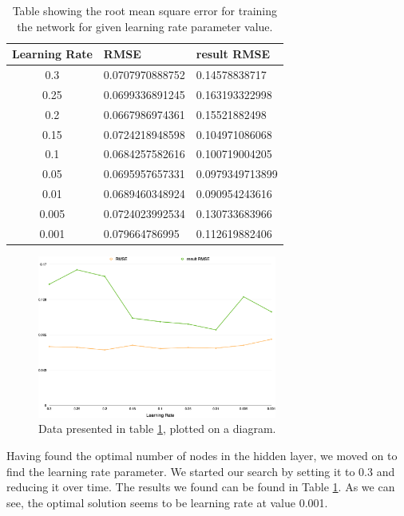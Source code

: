 \begin{table}
\begin{center}
\begin{tabular} {| c | l | l |} \hline
 Learning Rate & RMSE & result RMSE \\  \hline \hline
 0.3 & 0.0707970888752 & 0.14578838717 \\ \hline
 0.25 & 0.0699336891245 & 0.163193322998 \\ \hline
 0.2 &  0.0667986974361 & 0.15521882498 \\ \hline
 0.15 & 0.0724218948598 & 0.104971086068 \\ \hline
 0.1 & 0.0684257582616 & 0.100719004205 \\ \hline
 0.05 & 0.0695957657331 & 0.0979349713899 \\ \hline
 0.01 & 0.0689460348924 & 0.090954243616 \\ \hline
 0.005 & 0.0724023992534 & 0.130733683966 \\ \hline
 0.001 &  0.079664786995 & 0.112619882406 \\ \hline
\end{tabular}
\caption{Table showing the root mean square error for training the network for given learning rate parameter value.}
\label{table:learningrate}
\end{center}
\end{table}

\begin{figure}[h]
	\centering
   \includegraphics[width=0.7\textwidth]{Figures/learningrate}
\caption{Data presented in table \ref{table:learningrate}, plotted on a diagram.}
\end{figure}


Having found the optimal number of nodes in the hidden layer, we moved on to find the learning rate parameter. We started our search by setting it to 0.3 and reducing it over time. The results we found can be found in Table \ref{table:learningrate}. As we can see, the optimal solution seems to be learning rate at value 0.001.


